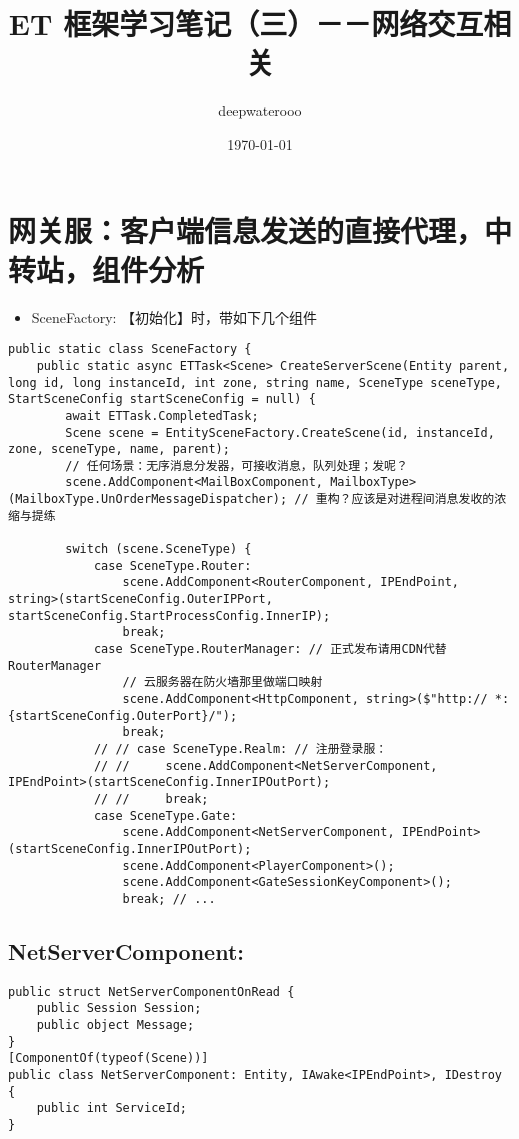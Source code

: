 \documentclass[9pt, b5paper]{article}
\author{deepwaterooo}
\date{\today}
\title{ET 框架学习笔记（三）－－网络交互相关}
\begin{document}
\maketitle
\tableofcontents


\section{网关服：客户端信息发送的直接代理，中转站，组件分析}
\label{sec-1}
\begin{itemize}
\item SceneFactory: 【初始化】时，带如下几个组件
\end{itemize}
\begin{verbatim}
public static class SceneFactory {
    public static async ETTask<Scene> CreateServerScene(Entity parent, long id, long instanceId, int zone, string name, SceneType sceneType, StartSceneConfig startSceneConfig = null) {
        await ETTask.CompletedTask;
        Scene scene = EntitySceneFactory.CreateScene(id, instanceId, zone, sceneType, name, parent);
        // 任何场景：无序消息分发器，可接收消息，队列处理；发呢？
        scene.AddComponent<MailBoxComponent, MailboxType>(MailboxType.UnOrderMessageDispatcher); // 重构？应该是对进程间消息发收的浓缩与提练

        switch (scene.SceneType) {
            case SceneType.Router:
                scene.AddComponent<RouterComponent, IPEndPoint, string>(startSceneConfig.OuterIPPort, startSceneConfig.StartProcessConfig.InnerIP);
                break;
            case SceneType.RouterManager: // 正式发布请用CDN代替RouterManager
                // 云服务器在防火墙那里做端口映射
                scene.AddComponent<HttpComponent, string>($"http:// *:{startSceneConfig.OuterPort}/");
                break;
            // // case SceneType.Realm: // 注册登录服：
            // //     scene.AddComponent<NetServerComponent, IPEndPoint>(startSceneConfig.InnerIPOutPort);
            // //     break;
            case SceneType.Gate:
                scene.AddComponent<NetServerComponent, IPEndPoint>(startSceneConfig.InnerIPOutPort);
                scene.AddComponent<PlayerComponent>();
                scene.AddComponent<GateSessionKeyComponent>();
                break; // ...
\end{verbatim}
\subsection{NetServerComponent:}
\label{sec-1-1}
\begin{verbatim}
public struct NetServerComponentOnRead {
    public Session Session;
    public object Message;
}
[ComponentOf(typeof(Scene))]
public class NetServerComponent: Entity, IAwake<IPEndPoint>, IDestroy {
    public int ServiceId;
}
\end{verbatim}
\end{document}
